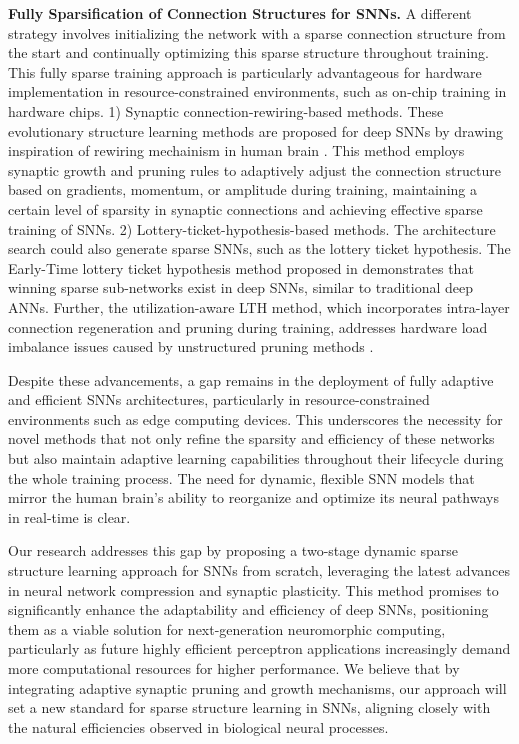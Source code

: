 \textbf{Fully Sparsification of Connection Structures for SNNs.} A different strategy involves initializing the network with a sparse connection structure from the start and continually optimizing this sparse structure throughout training. This fully sparse training approach is particularly advantageous for hardware implementation in resource-constrained environments, such as on-chip training in hardware chips. 1) Synaptic connection-rewiring-based methods. 
These evolutionary structure learning methods are proposed for deep SNNs by drawing inspiration of rewiring mechainism in human brain \citep{han2024adaptive,shen2023esl,li2024towards}. This method employs synaptic growth and pruning rules to adaptively adjust the connection structure based on gradients, momentum, or amplitude during training, maintaining a certain level of sparsity in synaptic connections and achieving effective sparse training of SNNs. 2) Lottery-ticket-hypothesis-based methods. The architecture search could also generate sparse SNNs, such as the lottery ticket hypothesis. The Early-Time lottery ticket hypothesis method proposed in \citep{kim2022exploring} demonstrates that winning sparse sub-networks exist in deep SNNs, similar to traditional deep ANNs. Further, the utilization-aware LTH method, which incorporates intra-layer connection regeneration and pruning during training, addresses hardware load imbalance issues caused by unstructured pruning methods \citep{yin2024workload}.


Despite these advancements, a gap remains in the deployment of fully adaptive and efficient SNNs architectures, particularly in resource-constrained environments such as edge computing devices. This underscores the necessity for novel methods that not only refine the sparsity and efficiency of these networks but also maintain adaptive learning capabilities throughout their lifecycle during the whole training process. The need for dynamic, flexible SNN models that mirror the human brain’s ability to reorganize and optimize its neural pathways in real-time is clear.

Our research addresses this gap by proposing a two-stage dynamic sparse structure learning approach for SNNs from scratch, leveraging the latest advances in neural network compression and synaptic plasticity. This method promises to significantly enhance the adaptability and efficiency of deep SNNs, positioning them as a viable solution for next-generation neuromorphic computing, particularly as future highly efficient perceptron applications \citep{chen2025rethinking, guan2022relative, guan2024six, liang2024camera} increasingly demand more computational resources for higher performance.
We believe that by integrating adaptive synaptic pruning and growth mechanisms, our approach will set a new standard for sparse structure learning in SNNs, aligning closely with the natural efficiencies observed in biological neural processes.